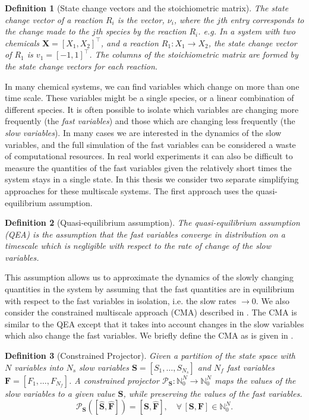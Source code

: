 \documentclass[final]{siamltex}
\newtheorem{dfn}{Definition}[section]
\begin{document}
\begin{dfn}[State change vectors and the stoichiometric matrix]
	The {\it state change vector} of a reaction $R_i$ is the vector, $\nu_i$, where the $j$th entry corresponds to the change made to the $j$th species by the reaction $R_i$. e.g. In a system with two chemicals $\mathbf{X} = [X_1, X_2]^\top$, and a reaction $R_1\colon X_1 \rightarrow X_2$, the state change vector of $R_1$ is $v_1 = [-1, 1]^\top$. The columns of the {\it stoichiometric matrix} are formed by the state change vectors for each reaction.
\end{dfn}


In many chemical systems, we can find variables which change on more than one time scale. These variables might be a single species, or a linear combination of different species. It is often possible to isolate which variables are changing more frequently (the \textit{fast variables}) and those which are changing less frequently (the \textit{slow variables}). In many cases we are interested in the dynamics of the slow variables, and the full simulation of the fast variables can be considered a waste of computational resources. In real world experiments it can also be difficult to measure the quantities of the fast variables given the relatively short times the system stays in a single state. In this thesis we consider two separate simplifying approaches for these multiscale systems. The first approach uses the quasi-equilibrium assumption.

\begin{dfn}[Quasi-equilibrium assumption]
	The quasi-equilibrium assumption (QEA) is the assumption that the fast variables converge in distribution on a timescale which is negligible with respect to the rate of change of the slow variables.
\end{dfn}

This assumption allows us to approximate the dynamics of the slowly changing quantities in the system by assuming that the fast quantities are in equilibrium with respect to the fast variables in isolation, i.e. the slow rates $\rightarrow 0$. We also consider the constrained multiscale approach (CMA) described in \cite{cotter2011constrained,cotter2016constrained}. The CMA is similar to the QEA except that it takes into account changes in the slow variables which also change the fast variables. We briefly define the CMA as is given in \cite{cotter2016constrained}.

\begin{dfn}[Constrained Projector]\label{dfn:constrained_projector}
	Given a partition of the state space with $N$ variables into $N_s$ slow variables $\mathbf{S} = [S_1,\dots, S_{N_s}]$ and $N_f$ fast variables $\mathbf{F} = [F_1,\dots, F_{N_f}]$. A constrained projector $\mathcal{P}_\mathbf{S}\colon\mathbb{N}^N_0\rightarrow\mathbb{N}^N_0$ maps the values of the slow variables to a given value $\mathbf{S}$, while preserving the values of the fast variables.
\[
	\mathcal{P}_\mathbf{S}([\hat{\mathbf{S}}, \hat{\mathbf{F}}]) = [\mathbf{S}, \hat{\mathbf{F}}], \quad \forall \, [\mathbf{S},\mathbf{F}] \in \mathbb{N}_0^N.
\]
\end{dfn}
\end{document}
